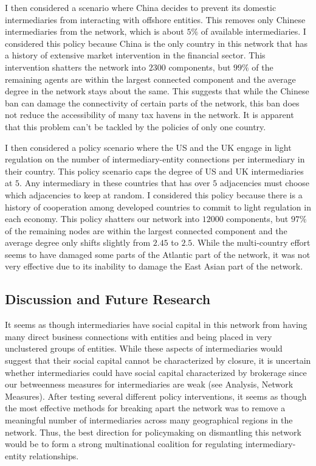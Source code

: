 \documentclass[11pt]{article}
\begin{document}
I then considered a scenario where China decides to prevent its domestic
intermediaries from interacting with offshore entities. This removes only
Chinese intermediaries from the network, which is about $5\%$ of available
intermediaries. I considered this policy because China is the
only country in this network that has a history of extensive market
intervention in the financial sector.
This intervention shatters the network into $2300$ components, but $99\%$ of
the remaining agents are within the largest connected component and the average
degree in the network stays about the same. This suggests that while the
Chinese ban can damage the connectivity of certain parts of the network,
this ban does not reduce the accessibility of many tax havens in the network. 
It is apparent that this problem can't be tackled by the policies of only 
one country.

I then considered a policy scenario where the US and the UK engage in light
regulation on the number of intermediary-entity connections per intermediary
in their country. This policy scenario caps the degree of US and UK
intermediaries at $5.$ Any intermediary in these countries that has over
$5$ adjacencies must choose which adjacencies to keep at random. I considered
this policy because there is a history of cooperation among developed countries
to commit to light regulation in each economy. This policy shatters
our network into $12000$ components, but $97\%$ of the remaining nodes are
within the largest connected component and the average degree only shifts
slightly from $2.45$ to $2.5$. While the multi-country effort seems to 
have damaged some parts of the Atlantic part of the network, it was not very
effective due to its inability to damage the East Asian part of the network.

\subsection{Discussion and Future Research}

It seems as though intermediaries have social capital in this network from
having many direct business connections with entities and being placed in 
very unclustered groups of entities. While these aspects of intermediaries
would suggest that their social capital cannot be characterized by closure, it
is uncertain whether intermediaries could have social capital characterized
by brokerage since our betweenness measures for intermediaries are weak (see
Analysis, Network Measures). After testing several different
policy interventions, it seems as though the most effective methods for
breaking apart the network was to remove a meaningful number of intermediaries
across many geographical regions in the network. Thus, the best direction for 
policymaking on dismantling this network would be to form a strong 
multinational coalition for regulating intermediary-entity relationships.
\end{document}
